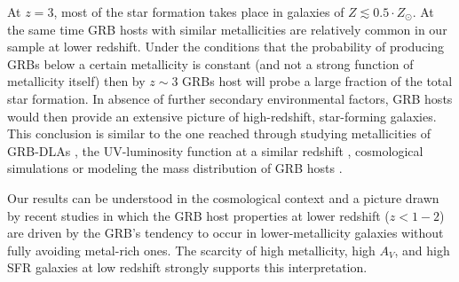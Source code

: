 \documentclass[traditabstract, longauth]{aa}
\begin{document}
At $z=3$, most of the star formation takes place in galaxies of $Z\lesssim0.5\cdot Z_\odot$. At the same time GRB hosts with similar metallicities are relatively common in our sample at lower redshift. Under the conditions that the probability of producing GRBs below a certain metallicity is constant (and not a strong function of metallicity itself) then by $z\sim3$ GRBs host will probe a large fraction of the total star formation. In absence of further secondary environmental factors, GRB hosts would then provide an extensive picture of high-redshift, star-forming galaxies. This conclusion is similar to the one reached through studying metallicities of GRB-DLAs \citep{2008ApJ...683..321F, 2014arXiv1410.3510A}, the UV-luminosity function at a similar redshift \citep{2005MNRAS.362..245J, 2015arXiv150304246S, 2015arXiv150305323G}, cosmological simulations \citep{2010MNRAS.408..647C} or modeling the mass distribution of GRB hosts \citep{2009ApJ...702..377K}.

Our results can be understood in the cosmological context and a picture drawn by recent studies \citep{2008AJ....135.1136M, 2009ApJ...702..377K, 2013A&A...557A..34B, 2013ApJ...778..128P, 2014arXiv1409.7064V, 2014ApJS..213...15W, 2014arXiv1406.1503T, 2015arXiv150402479P,  2015arXiv150304246S} in which the GRB host properties at lower redshift ($z < 1-2$) are driven by the GRB's tendency to occur in lower-metallicity galaxies without fully avoiding metal-rich ones. The scarcity of high metallicity, high $A_V$, and high SFR galaxies at low redshift strongly supports this interpretation.
\end{document}
